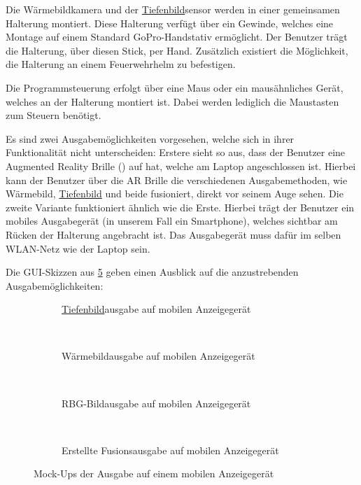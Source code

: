Die Wärmebildkamera und der \hyperlink{tab:tiefe}{Tiefenbild}sensor werden in einer gemeinsamen Halterung montiert.
Diese Halterung verfügt über ein Gewinde, welches eine Montage auf einem Standard GoPro-Handstativ ermöglicht.
Der Benutzer trägt die Halterung, über diesen Stick, per Hand.
Zusätzlich existiert die Möglichkeit, die Halterung an einem Feuerwehrhelm zu befestigen.

Die Programmsteuerung erfolgt über eine Maus oder ein mausähnliches Gerät, welches \ggf an der Halterung montiert ist.
Dabei werden lediglich die Maustasten zum Steuern benötigt.

Es sind zwei Ausgabemöglichkeiten vorgesehen, welche sich in ihrer Funktionalität nicht unterscheiden:
Erstere sieht so aus, dass der Benutzer eine Augmented Reality Brille (\meta) auf hat, welche am Laptop angeschlossen ist.
Hierbei kann der Benutzer über die AR Brille die verschiedenen Ausgabemethoden, wie Wärmebild, \hyperlink{tab:tiefe}{Tiefenbild} und beide fusioniert, direkt vor seinem Auge sehen.
Die zweite Variante funktioniert ähnlich wie die Erste.
Hierbei trägt der Benutzer ein mobiles Ausgabegerät (in unserem Fall ein Smartphone), welches \ggf sichtbar am Rücken der Halterung angebracht ist.
Das Ausgabegerät muss dafür im selben WLAN-Netz wie der Laptop sein.

Die GUI-Skizzen aus \cref{fig:spezi_mockup} geben einen Ausblick auf die anzustrebenden Ausgabemöglichkeiten:
\begin{figure}[t]
	\centering
	\begin{subfigure}[t]{0.45\textwidth}
		\centering
		\caption{\hyperlink{tab:tiefe}{Tiefenbild}ausgabe auf mobilen Anzeigegerät}
		\label{fig:spezi_deepth_mockup}
	\end{subfigure}
	~
	\begin{subfigure}[t]{0.45\textwidth}
		\centering
		\caption{Wärmebildausgabe auf mobilen Anzeigegerät}
		\label{fig:spezi_heat_mockup}
	\end{subfigure}
	~
	\begin{subfigure}[t]{0.45\textwidth}
		\centering
		\caption{RBG-Bildausgabe auf mobilen Anzeigegerät}
		\label{fig:spezi_rgb_mockup}
	\end{subfigure}
	~
	\begin{subfigure}[t]{0.45\textwidth}
		\centering
		\caption{Erstellte Fusionsausgabe auf mobilen Anzeigegerät}
		\label{fig:spezi_fus_mockup}
	\end{subfigure}
	\caption{Mock-Ups der Ausgabe auf einem mobilen Anzeigegerät}
	\label{fig:spezi_mockup}
\end{figure}


